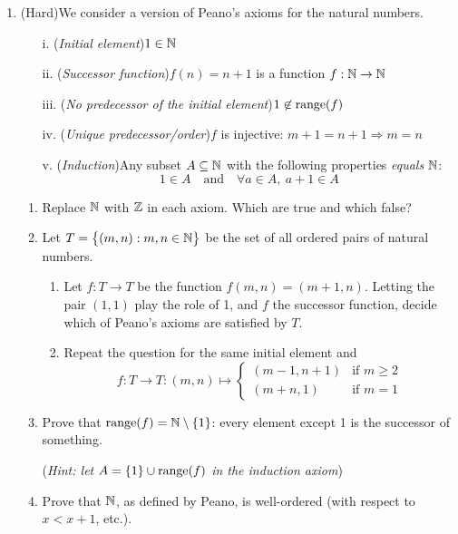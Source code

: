 \begin{exercises}
\begin{enumerate}
	
	  \item\label{exs:peano} (Hard)\lstsp We consider a version of Peano's axioms for the natural numbers.
		\begin{itemize}
			\item[i.] (\emph{Initial element})\lstsp $1\in\mathbb{N}$
			\item[ii.] (\emph{Successor function})\lstsp $f(n)=n+1$ is a function $f:\mathbb{N}\to\mathbb{N}$
			\item[iii.] (\emph{No predecessor of the initial element})\lstsp $1\not\in\operatorname{range}(f)$
			\item[iv.] (\emph{Unique predecessor/order})\lstsp $f$ is injective: $m+1=n+1\Longrightarrow m=n$
			\item[v.] (\emph{Induction})\lstsp Any subset $A\subseteq\mathbb{N}$ with the following properties \emph{equals} $\mathbb{N}$:
			\[
				1\in A\quad\text{and}\quad \forall a\in A,\ a+1\in A
			\]
		\end{itemize}
		\begin{enumerate}
			\item Replace $\mathbb{N}$ with $\mathbb{Z}$ in each axiom. Which are true and which false?
			\item Let $T=\bigl\{(m,n):m,n\in\mathbb{N}\bigr\}$ be the set of all ordered pairs of natural numbers.
			\begin{enumerate}
			  \item Let $f:T\to T$ be the function $f(m,n)=(m+1,n)$. Letting the pair $(1,1)$ play the role of 1, and $f$ the successor function, decide which of Peano's axioms are satisfied by $T$.
				\item Repeat the question for the same initial element and 
				\[
					f:T\to T:(m,n)\mapsto
					\begin{cases}
						(m-1,n+1)&\text{if }m\ge 2\\
						(m+n,1)&\text{if }m=1
					\end{cases}
				\]
			\end{enumerate}
			\item Prove that $\operatorname{range}(f)=\mathbb{N}\setminus\{1\}$: every element except 1 is the successor of something.\par
			(\emph{Hint: let $A=\{1\}\cup\operatorname{range}(f)$ in the induction axiom})
			\item Prove that $\mathbb{N}$, as defined by Peano, is well-ordered (with respect to $x<x+1$, etc.).
		\end{enumerate}

	\end{enumerate}

\end{exercises}


